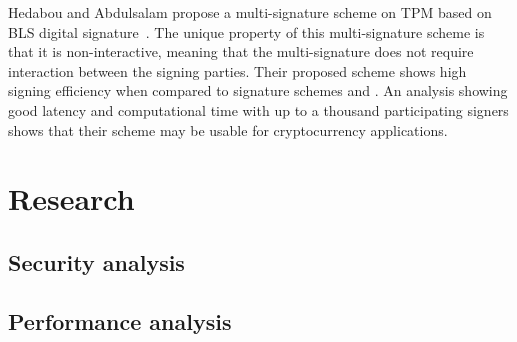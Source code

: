 Hedabou and Abdulsalam \cite{hedabou2020efficient} propose a multi-signature scheme on TPM based on BLS digital signature~\cite{blsSignatures}. The unique property of this multi-signature scheme is that it is non-interactive, meaning that the multi-signature does not require interaction between the signing parties. Their proposed scheme shows high signing efficiency when compared to signature schemes \cite{chen2013flexible} and \cite{schnorrSpec}. An analysis showing good latency and computational time with up to a thousand participating signers shows that their scheme may be usable for cryptocurrency applications.

\section{Research}

\subsection{Security analysis}

\subsection{Performance analysis}

